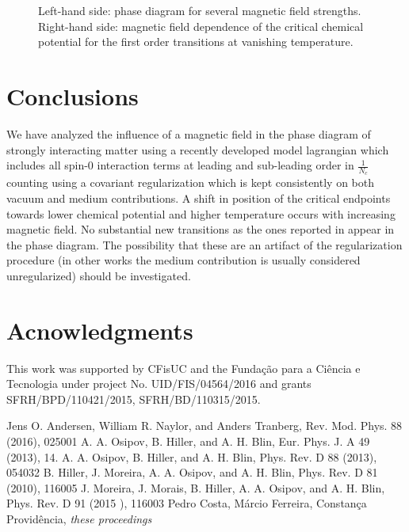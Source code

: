 \documentclass{PoS}
\begin{document}
\begin{figure}
\centering
	\caption{Left-hand side: phase diagram for several magnetic field strengths. Right-hand side: magnetic field dependence of the critical chemical potential for the first order transitions at vanishing temperature.}
\end{figure}

\section{Conclusions}

We have analyzed the influence of a magnetic field in the phase diagram of strongly interacting matter using a recently developed model lagrangian which includes  all spin-0 interaction terms at leading and sub-leading order in $\frac{1}{N_c}$ counting using a covariant regularization which is kept consistently on both vacuum and medium contributions. A shift in position of the critical endpoints towards lower chemical potential and higher temperature occurs with increasing magnetic field. No substantial new transitions as the ones reported in \cite{PCosta} appear in the phase diagram. The possibility that these are an artifact of the regularization procedure (in other works the medium contribution is usually considered unregularized) should be investigated. 

\section*{Acnowledgments}
This work was supported by CFisUC and the Funda\c{c}\~{a}o para a Ci\^{e}ncia e Tecnologia under project No. UID/FIS/04564/2016 and grants SFRH/BPD/110421/2015, SFRH/BD/110315/2015.

\begin{thebibliography}{99}
   Jens O. Andersen, William R. Naylor, and Anders Tranberg, Rev. Mod. Phys. 88 (2016), 025001 
	 A. A. Osipov, B. Hiller, and A. H. Blin, Eur. Phys. J. A 49 (2013), 14.
	 A. A. Osipov, B. Hiller, and A. H. Blin, Phys. Rev. D 88 (2013), 054032
	 B. Hiller, J. Moreira, A. A. Osipov, and A. H. Blin, Phys. Rev. D 81 (2010), 116005
	 J. Moreira, J. Morais, B. Hiller, A. A. Osipov, and A. H. Blin, Phys. Rev. D 91 (2015 ), 116003
	 Pedro Costa, M\'{a}rcio Ferreira, Constan\c{c}a Provid\^{e}ncia, \emph{these proceedings}
\end{thebibliography}
\end{document}
